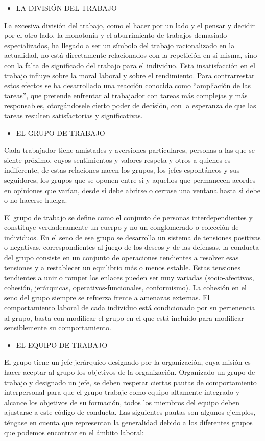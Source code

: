 \begin{itemize}
  \item LA DIVISIÓN DEL TRABAJO
\end{itemize}
La excesiva división del trabajo, como el hacer por un lado y el pensar y decidir por el otro lado, la monotonía y el aburrimiento de trabajos demasiado especializados, ha llegado a ser un símbolo del trabajo racionalizado en la actualidad, no está directamente relacionados con la repetición en sí misma, sino con la falta de significado del trabajo para el individuo. Esta insatisfacción en el trabajo influye sobre la moral laboral y sobre el rendimiento. Para contrarrestar estos efectos se ha desarrollado una reacción conocida como “ampliación de las tareas”, que pretende enfrentar al trabajador con tareas más complejas y más responsables, otorgándosele cierto poder de decisión, con la esperanza de que las tareas resulten satisfactorias y significativas.

\begin{itemize}
  \item EL GRUPO DE TRABAJO
\end{itemize}
Cada trabajador tiene amistades y aversiones particulares, personas a las que se siente próximo, cuyos sentimientos y valores respeta y otros a quienes es indiferente, de estas relaciones nacen los grupos, los jefes espontáneos y sus seguidores, los grupos que se oponen entre si y aquellos que permanecen acordes en opiniones que varían, desde si debe abrirse o cerrase una ventana hasta si debe o no hacerse huelga.

El grupo de trabajo se define como el conjunto de personas interdependientes y constituye verdaderamente un cuerpo y no un conglomerado o colección de individuos. En el seno de ese grupo se desarrolla un sistema de tensiones positivas o negativas, correspondientes al juego de los deseos y de las defensas, la conducta del grupo consiste en un conjunto de operaciones tendientes a resolver esas tensiones y a restablecer un equilibrio más o menos estable. Estas tensiones tendientes a unir o romper los enlaces pueden ser muy variadas (socio-afectivos, cohesión, jerárquicas, operativos-funcionales, conformismo). La cohesión en el seno del grupo siempre se refuerza frente a amenazas externas. El comportamiento laboral de cada individuo está condicionado por su pertenencia al grupo, basta con modificar el grupo en el que está incluido para modificar sensiblemente su comportamiento.

\begin{itemize}
  \item EL EQUIPO DE TRABAJO
\end{itemize}
El grupo tiene un jefe jerárquico designado por la organización, cuya misión es hacer aceptar al grupo los objetivos de la organización. Organizado un grupo de trabajo y designado un jefe, se deben respetar ciertas pautas de comportamiento interpersonal para que el grupo trabaje como equipo altamente integrado y alcance los objetivos de su formación, todos los miembros del equipo deben ajustarse a este código de conducta. Las siguientes pautas son algunos ejemplos, téngase en cuenta que representan la generalidad debido a los diferentes grupos que podemos encontrar en el ámbito laboral:

